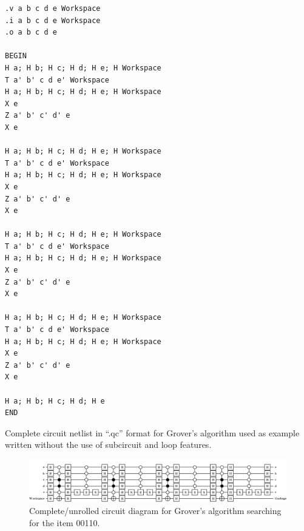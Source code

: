 \documentclass[aps,prl,reprint,floatfix,superscriptaddress]{revtex4-1} %
\begin{document}
\begin{program}
\begin{verbatim}
.v a b c d e Workspace
.i a b c d e Workspace
.o a b c d e

BEGIN
H a; H b; H c; H d; H e; H Workspace
T a' b' c d e' Workspace
H a; H b; H c; H d; H e; H Workspace
X e
Z a' b' c' d' e
X e

H a; H b; H c; H d; H e; H Workspace
T a' b' c d e' Workspace
H a; H b; H c; H d; H e; H Workspace
X e
Z a' b' c' d' e
X e

H a; H b; H c; H d; H e; H Workspace
T a' b' c d e' Workspace
H a; H b; H c; H d; H e; H Workspace
X e
Z a' b' c' d' e
X e

H a; H b; H c; H d; H e; H Workspace
T a' b' c d e' Workspace
H a; H b; H c; H d; H e; H Workspace
X e
Z a' b' c' d' e
X e

H a; H b; H c; H d; H e
END
\end{verbatim}
\caption{Complete circuit netlist in ``.qc'' format for Grover's algorithm used as example written without the use of subcircuit and loop features.}
\label{l:netlist}
\end{program}
\begin{figure}[ht]
\includegraphics[scale=0.3]{grover_netlist}
\caption{Complete/unrolled circuit diagram for Grover's algorithm searching for the item 00110.}
\label{f:netlist}
\end{figure}


\end{document}
